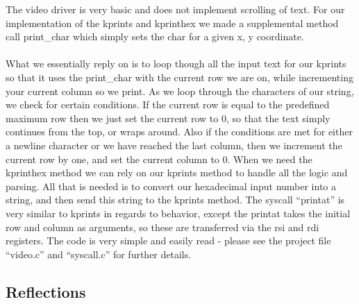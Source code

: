 The video driver is very basic and does not implement scrolling of text. For our implementation of the kprints and kprinthex we made a supplemental method call print\_char which simply sets the char for a given x, y coordinate. \\\\
What we essentially reply on is to loop though all the input text for our kprints so that it uses the print\_char with the current row we are on, while incrementing your current column so we print. As we loop through the characters of our string, we check for certain conditions. If the current row is equal to the predefined maximum row then we just set the current row to 0, so that the text simply continues from the top, or wraps around. Also if the conditions are met for either a newline character or we have reached the last column, then we increment the current row by one, and set the current column to 0.
When we need the kprinthex method we can rely on our kprints method to handle all the logic and parsing. All that is needed is to convert our hexadecimal input number into a string, and then send this string to the kprints method.
The syscall “printat” is very similar to kprints in regards to behavior, except the printat takes the initial row and column as arguments, so these are transferred via the rsi and rdi registers.
 The code is very simple and easily read - please see the project file “video.c” and “syscall.c” for further details.

\subsection{Reflections}

